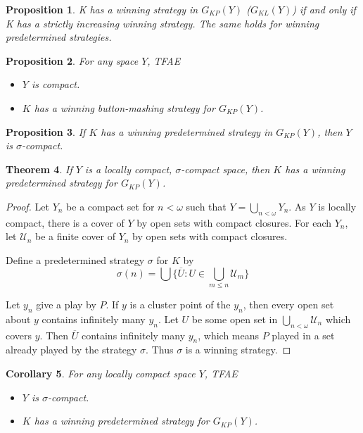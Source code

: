\documentclass[11pt]{article}
\theoremstyle{plain}
\newtheorem{theorem}{Theorem}
\newtheorem{corollary}[theorem]{Corollary}
\newtheorem{proposition}[theorem]{Proposition}
\theoremstyle{definition}
\theoremstyle{remark}
\begin{document}

\begin{proposition}
K has a winning strategy in $G_{KP}(Y)$ ($G_{KL}(Y)$) if and only if K has a strictly increasing winning strategy.  The same holds for winning predetermined strategies.
\end{proposition}

\begin{proposition}
For any space $Y$, TFAE
  \begin{itemize}
  \item $Y$ is compact.
  \item $K$ has a winning button-mashing strategy for $G_{KP}(Y)$.
  \end{itemize}
\end{proposition}

\begin{proposition}
If $K$ has a winning predetermined strategy in $G_{KP}(Y)$, then $Y$ is $\sigma$-compact.
\end{proposition}

\begin{theorem}
If $Y$ is a locally compact, $\sigma$-compact space, then $K$ has a winning predetermined strategy for $G_{KP}(Y)$.
\end{theorem}

\begin{proof}
Let $Y_n$ be a compact set for $n<\omega$ such that $Y=\bigcup_{n<\omega}Y_n$. As $Y$ is locally compact, there is a cover of $Y$ by open sets with compact closures. For each $Y_n$, let $\mathcal{U}_n$ be a finite cover of $Y_n$ by open sets with compact closures.

Define a predetermined strategy $\sigma$ for $K$ by \[\sigma(n)=\bigcup \{\overline{U}: U\in \bigcup_{m\leq n} \mathcal{U}_m\}\]

Let $y_n$ give a play by $P$. If $y$ is a cluster point of the $y_n$, then every open set about $y$ contains infinitely many $y_n$. Let $U$ be some open set in $\bigcup_{n<\omega} \mathcal{U}_n$ which covers $y$. Then $\overline{U}$ contains infinitely many $y_n$, which means $P$ played in a set already played by the strategy $\sigma$. Thus $\sigma$ is a winning strategy.
\end{proof}

\begin{corollary}
For any locally compact space $Y$, TFAE
  \begin{itemize}
  \item $Y$ is $\sigma$-compact.
  \item $K$ has a winning predetermined strategy for $G_{KP}(Y)$.
  \end{itemize}
\end{corollary}
\end{document}
